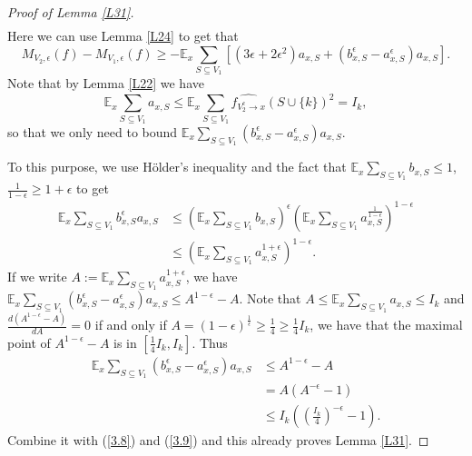 \documentclass[10pt]{article} \usepackage[utf8]{inputenc}
\theoremstyle{definition}
\theoremstyle{remark}
\numberwithin{equation}{section}
\begin{document}
\begin{proof}[Proof of Lemma \ref{L31}]
\begin{equation}
\begin{aligned}
\end{aligned}
\end{equation}
Here we can use Lemma \ref{L24} to get that
\begin{equation}
\label{3.8}
M_{V_2,\epsilon}(f)-M_{V_1,\epsilon}(f) \geq -\mathbb{E}_x\sum_{S\subseteq V_1}[(3\epsilon+2\epsilon^2)a_{x,S}+(b_{x,S}^\epsilon-a_{x,S}^\epsilon)a_{x,S}].
\end{equation}
Note that by Lemma \ref{L22} we have 
\begin{equation}
\label{3.9}
\mathbb{E}_x\sum_{S\subseteq V_1}a_{x,S} \leq \mathbb{E}_x\sum_{S\subseteq V_1}\widehat{f_{V_2^{c} \to x}}(S\cup \{k\})^2=I_k,
\end{equation}
so that we only need to bound $\mathbb{E}_x\sum\limits_{S\subseteq V_1}(b_{x,S}^\epsilon-a_{x,S}^\epsilon)a_{x,S}$.

To this purpose,  we use Hölder's inequality and the fact that $\mathbb{E}_x\sum\limits_{S\subseteq V_1} b_{x, S} \leq 1$, $\frac{1}{1-\epsilon} \geq 1+\epsilon$ to get 
\begin{equation}
\begin{aligned}
\mathbb{E}_x\sum_{S\subseteq V_1}b_{x,S}^\epsilon a_{x,S} & \leq (\mathbb{E}_x\sum_{S\subseteq V_1} b_{x,S})^\epsilon (\mathbb{E}_x\sum_{S\subseteq V_1}a_{x,S}^{\frac{1}{1-\epsilon}})^{1-\epsilon}\\
&\leq (\mathbb{E}_x\sum_{S\subseteq V_1}a_{x,S}^{1+\epsilon})^{1-\epsilon}.
\end{aligned}
\end{equation}
If we write $A:=\mathbb{E}_x\sum\limits_{S\subseteq V_1}a_{x,S}^{1+\epsilon}$, we have $\mathbb{E}_x\sum\limits_{S\subseteq V_1}(b_{x,S}^\epsilon-a_{x,S}^\epsilon)a_{x,S}\leq A^{1-\epsilon}-A$. Note that $A \leq \mathbb{E}_x\sum\limits_{S\subseteq V_1}a_{x,S}\leq I_k$ and $\frac{d(A^{1-\epsilon}-A)}{dA}=0$ if and only if $A=(1-\epsilon)^{\frac{1}{\epsilon}}\geq \frac{1}{4} \geq \frac{1}{4}I_k$, we have that the maximal point of $A^{1-\epsilon}-A$ is in $[\frac{1}{4}I_k, I_k]$. Thus 
\begin{equation}
\begin{aligned}
\mathbb{E}_x\sum_{S\subseteq V_1}(b_{x,S}^\epsilon-a_{x,S}^\epsilon)a_{x,S}&\leq A^{1-\epsilon}-A\\
&= A(A^{-\epsilon} -1)\\
&\leq I_k((\frac{I_k}{4})^{-\epsilon}-1).
\end{aligned}
\end{equation} 
Combine it with (\ref{3.8}) and (\ref{3.9}) and this already proves Lemma \ref{L31}.
\end{proof}
\end{document}
